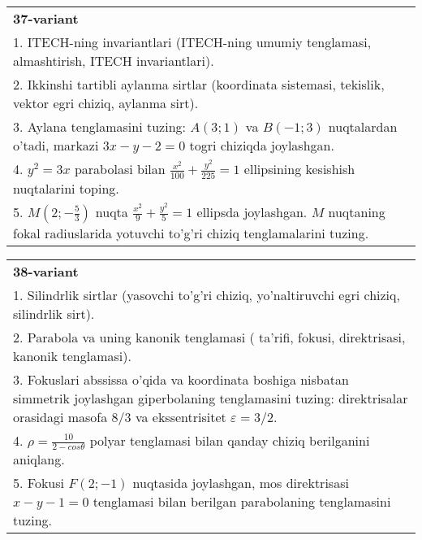 \documentclass{article}
\begin{document}
\begin{tabular}{m{17cm}}
\textbf{37-variant}\\
1. ITECH-ning invariantlari (ITECH-ning umumiy tenglamasi, almashtirish, ITECH invariantlari).\\

2. Ikkinshi tartibli aylanma sirtlar (koordinata sistemasi, tekislik, vektor egri chiziq, aylanma sirt).\\

3. Aylana tenglamasini tuzing: $A(3;1)$ va $B(-1;3)$ nuqtalardan o'tadi, markazi $3x-y-2=0$ togri chiziqda joylashgan.\\

4. $y^{2} = 3x$ parabolasi bilan $\frac{x^{2}}{100} + \frac{y^{2}}{225} = 1$ ellipsining kesishish nuqtalarini toping.  \\

5. $M(2; - \frac{5}{3})$ nuqta $\frac{x^{2}}{9} + \frac{y^{2}}{5} = 1$ ellipsda joylashgan. $M$ nuqtaning fokal radiuslarida yotuvchi to'g'ri chiziq tenglamalarini tuzing.  
\end{tabular}
\vspace{1cm}


\begin{tabular}{m{17cm}}
\textbf{38-variant}\\
1. Silindrlik sirtlar (yasovchi to'g'ri chiziq, yo'naltiruvchi egri chiziq, silindrlik sirt).\\

2. Parabola va uning kanonik tenglamasi ( ta'rifi, fokusi, direktrisasi, kanonik tenglamasi).\\

3. Fokuslari abssissa o'qida va koordinata boshiga nisbatan simmetrik joylashgan giperbolaning tenglamasini tuzing: direktrisalar orasidagi masofa $8/3$ va ekssentrisitet $\varepsilon=3/2$.\\

4. $\rho = \frac{10}{2 - cos\theta}$ polyar tenglamasi bilan qanday chiziq berilganini aniqlang.  \\

5. Fokusi $F(2; - 1)$ nuqtasida joylashgan, mos direktrisasi $x - y - 1 = 0$ tenglamasi bilan berilgan parabolaning tenglamasini tuzing.  
\end{tabular}
\vspace{1cm}
\end{document}
